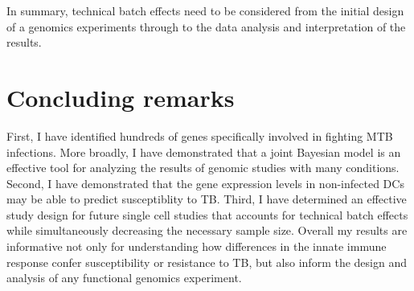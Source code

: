 In summary, technical batch effects need to be considered from the
initial design of a genomics experiments through to the data analysis
and interpretation of the results.

\section{Concluding remarks}

First, I have identified hundreds of genes specifically involved in
fighting MTB infections. More broadly, I have demonstrated that a
joint Bayesian model is an effective tool for analyzing the results of
genomic studies with many conditions. Second, I have demonstrated that
the gene expression levels in non-infected DCs may be able to predict
susceptiblity to TB. Third, I have determined an effective study
design for future single cell studies that accounts for technical
batch effects while simultaneously decreasing the necessary sample
size. Overall my results are informative not only for understanding
how differences in the innate immune response confer susceptibility or
resistance to TB, but also inform the design and analysis of any
functional genomics experiment.
